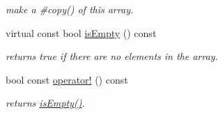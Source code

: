 \begin{DoxyCompactItemize}
\begin{DoxyCompactList}\small\item\em make a \#copy() of this array. \end{DoxyCompactList}\item 
\hypertarget{classparray_1_1PointerArray_adf7c87ef3e5b66d11137209d45701975}{virtual const bool \hyperlink{classparray_1_1PointerArray_adf7c87ef3e5b66d11137209d45701975}{is\-Empty} () const }\label{classparray_1_1PointerArray_adf7c87ef3e5b66d11137209d45701975}

\begin{DoxyCompactList}\small\item\em returns true if there are no elements in the array. \end{DoxyCompactList}\item 
\hypertarget{classparray_1_1PointerArray_ac1aa766707215ddeecbf23a0648644c5}{bool const \hyperlink{classparray_1_1PointerArray_ac1aa766707215ddeecbf23a0648644c5}{operator!} () const }\label{classparray_1_1PointerArray_ac1aa766707215ddeecbf23a0648644c5}

\begin{DoxyCompactList}\small\item\em returns \hyperlink{classparray_1_1PointerArray_adf7c87ef3e5b66d11137209d45701975}{is\-Empty()}. \end{DoxyCompactList}\end{DoxyCompactItemize}
